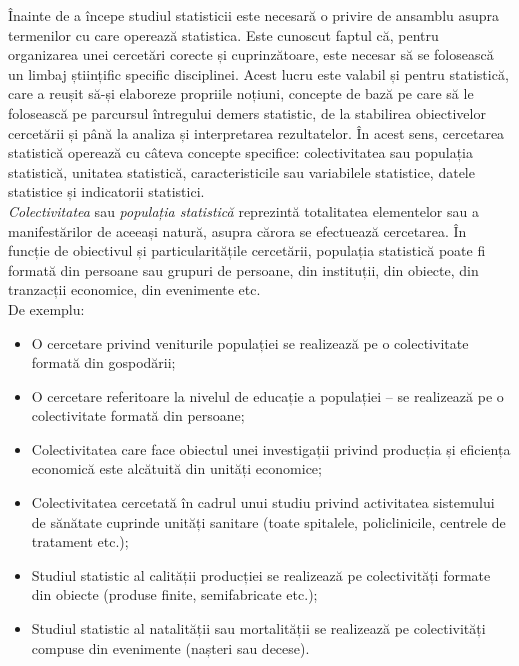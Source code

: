 \documentclass[
  11pt,
  b5paper,
  nottoc]{book}
\providecommand{\tightlist}{%
  \setlength{\itemsep}{0pt}\setlength{\parskip}{0pt}}\usepackage{longtable,booktabs,array}
\begin{document}
Înainte de a începe studiul statisticii este necesară o privire de
ansamblu asupra termenilor cu care operează statistica. Este cunoscut
faptul că, pentru organizarea unei cercetări corecte și cuprinzătoare,
este necesar să se folosească un limbaj științific specific disciplinei.
Acest lucru este valabil și pentru statistică, care a reușit să-și
elaboreze propriile noțiuni, concepte de bază pe care să le folosească
pe parcursul întregului demers statistic, de la stabilirea obiectivelor
cercetării și până la analiza și interpretarea rezultatelor. În acest
sens, cercetarea statistică operează cu câteva concepte specifice:
colectivitatea sau populația statistică, unitatea statistică,
caracteristicile sau variabilele statistice, datele statistice și
indicatorii statistici.\\
\emph{Colectivitatea} sau \emph{populația statistică} reprezintă
totalitatea elementelor sau a manifestărilor de aceeași natură, asupra
cărora se efectuează cercetarea. În funcție de obiectivul și
particularitățile cercetării, populația statistică poate fi formată din
persoane sau grupuri de persoane, din instituții, din obiecte, din
tranzacții economice, din evenimente etc.\\
De exemplu:

\begin{itemize}
\tightlist
\item
  O cercetare privind veniturile populației se realizează pe o
  colectivitate formată din gospodării;
\item
  O cercetare referitoare la nivelul de educație a populației -- se
  realizează pe o colectivitate formată din persoane;
\item
  Colectivitatea care face obiectul unei investigații privind producția
  și eficiența economică este alcătuită din unități economice;
\item
  Colectivitatea cercetată în cadrul unui studiu privind activitatea
  sistemului de sănătate cuprinde unități sanitare (toate spitalele,
  policlinicile, centrele de tratament etc.);
\item
  Studiul statistic al calității producției se realizează pe
  colectivități formate din obiecte (produse finite, semifabricate
  etc.);
\item
  Studiul statistic al natalității sau mortalității se realizează pe
  colectivități compuse din evenimente (nașteri sau decese).
\end{itemize}
\end{document}
